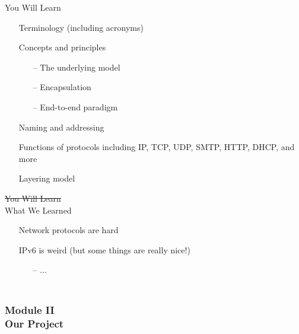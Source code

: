 \documentclass[professionalfonts, t, aspectratio=1610]{beamer}
\begin{document}
\renewcommand{\baselinestretch}{1.3}
\begin{frame}{You Will Learn}
\begin{itemize}
\item[\textbullet] Terminology (including acronyms)
\item[\textbullet] Concepts and principles
\begin{itemize}
  \item[--] The underlying model
  \item[--] Encapsulation
  \item[--] End-to-end paradigm
\end{itemize}
\item[\textbullet] Naming and addressing
\item[\textbullet] Functions of protocols including IP, TCP, UDP, SMTP, HTTP, DHCP, and more
\item[\textbullet] Layering model
\end{itemize}
\end{frame}

\renewcommand{\baselinestretch}{1.3}
\begin{frame}{\sout{You Will Learn}\\What We Learned}
\begin{itemize}
\item[\textbullet] Network protocols are hard
\item[\textbullet] IPv6 is weird (but some things are really nice!)
\begin{itemize}
  \item[--] ...
\end{itemize}
\end{itemize}
\end{frame}


\begin{frame}
\frametitle{ %
\bigskip \bigskip \bigskip \bigskip \bigskip \bigskip \\
Module II \\ \bigskip
Our Project} 
\end{frame}
\end{document}
